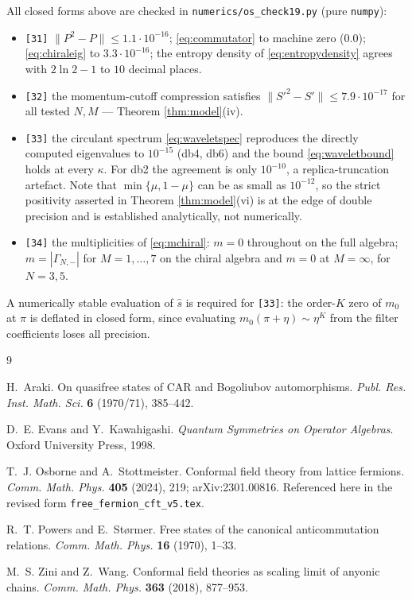 \documentclass[11pt,a4paper]{article}
\theoremstyle{definition}
\newcommand{\1}{\mathds{1}}
\newcommand{\Gam}{\Gamma}
\begin{document}
All closed forms above are checked in \texttt{numerics/os\_check19.py} (pure \texttt{numpy}):
\begin{itemize}
\item \texttt{[31]} $\|P^{2}-P\|\leq1.1\cdot10^{-16}$; \eqref{eq:commutator} to machine zero
($0.0$); \eqref{eq:chiraleig} to $3.3\cdot10^{-16}$; the entropy density of \eqref{eq:entropydensity}
agrees with $2\ln2-1$ to $10$ decimal places.
\item \texttt{[32]} the momentum-cutoff compression satisfies $\|S'^{2}-S'\|\leq7.9\cdot10^{-17}$ for
all tested $N,M$ --- Theorem \ref{thm:model}(iv).
\item \texttt{[33]} the circulant spectrum \eqref{eq:waveletspec} reproduces the directly computed
eigenvalues to $10^{-15}$ (db4, db6) and the bound \eqref{eq:waveletbound} holds at every $\kappa$.
For db2 the agreement is only $10^{-10}$, a replica-truncation artefact. Note that
$\min\{\mu,1-\mu\}$ can be as small as $10^{-12}$, so the strict positivity asserted in Theorem
\ref{thm:model}(vi) is at the edge of double precision and is established analytically, not
numerically.
\item \texttt{[34]} the multiplicities of \eqref{eq:mchiral}: $m=0$ throughout on the full algebra;
$m=|\Gam_{N,-}|$ for $M=1,\dots,7$ on the chiral algebra and $m=0$ at $M=\infty$, for
$N=3,5$.
\end{itemize}
A numerically stable evaluation of $\hat{s}$ is required for \texttt{[33]}: the order-$K$ zero of
$m_{0}$ at $\pi$ is deflated in closed form, since evaluating $m_{0}(\pi+\eta)\sim\eta^{K}$ from the
filter coefficients loses all precision.

\begin{thebibliography}{9}

H.~Araki.
\newblock On quasifree states of CAR and Bogoliubov automorphisms.
\newblock \emph{Publ. Res. Inst. Math. Sci.} \textbf{6} (1970/71), 385--442.

D.~E. Evans and Y.~Kawahigashi.
\newblock \emph{Quantum Symmetries on Operator Algebras}.
\newblock Oxford University Press, 1998.

T.~J. Osborne and A.~Stottmeister.
\newblock Conformal field theory from lattice fermions.
\newblock \emph{Comm. Math. Phys.} \textbf{405} (2024), 219; arXiv:2301.00816.
\newblock Referenced here in the revised form \texttt{free\_fermion\_cft\_v5.tex}.

R.~T. Powers and E.~St\o rmer.
\newblock Free states of the canonical anticommutation relations.
\newblock \emph{Comm. Math. Phys.} \textbf{16} (1970), 1--33.

M.~S. Zini and Z.~Wang.
\newblock Conformal field theories as scaling limit of anyonic chains.
\newblock \emph{Comm. Math. Phys.} \textbf{363} (2018), 877--953.

\end{thebibliography}
\end{document}
